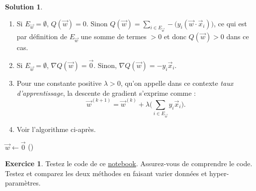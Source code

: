 \documentclass[a4paper,francais]{article}
\theoremstyle{definition}
\newtheorem{exercice}{Exercice}[section]
\newtheorem*{solution}{Solution}
\begin{document}
\begin{solution}
  \begin{enumerate}
  \item Si $E_{\vec{w}} = \emptyset$, $Q(\vec{w}) = 0$.
    Sinon $Q(\vec{w}) = \sum_{i \in E_{\vec{w}}} - \big( y_i (\vec{w}\cdot\vec{x}_i) \big)$,
    ce qui est par définition de $E_{\vec{w}}$ une somme de termes $> 0$ et donc
    $Q(\vec{w}) > 0$ dans ce cas. 
  \item Si $E_{\vec{w}} = \emptyset$, ${\nabla Q}(\vec{w}) = \vec{0}$. Sinon,
    ${\nabla Q}(\vec{w}) = -y_i \vec{x}_i$.
  \item Pour une constante positive $\lambda > 0$, qu'on appelle dans ce
    contexte \emph{taux d'apprentissage}, la descente de gradient s'exprime
    comme :
    \[ \vec{w}^{(k+1)} = \vec{w}^{(k)} + \lambda \big( \sum_{i \in E_{\vec{w}}} y_i \vec{x}_i \big). \]
  \item Voir l'algorithme ci-après. 
  \end{enumerate}
    \begin{algorithm}[htbp]
    \caption{Algorithme d'apprentissage du perceptron}
    $\vec{w} \leftarrow \vec{0}$ \;
    ()
     \;
  \end{algorithm}
\end{solution}

\begin{exercice}
  Testez le code de ce \href{https://colab.research.google.com/drive/1cvuj2CWTld3tFuDnzQWVJnj8rRHaTc-x?usp=sharing}{notebook}.  
  Assurez-vous de comprendre le code. Testez et comparez les deux méthodes 
  en faisant varier données et hyper-paramètres.  
\end{exercice}
\end{document}
